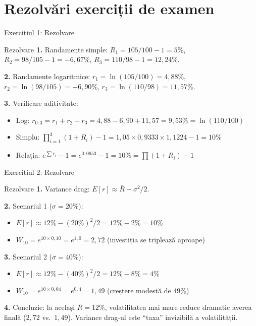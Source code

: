 \documentclass[9pt, aspectratio=169, t]{beamer}
\theoremstyle{definition}
\begin{document}
\section{Rezolvări exerciții de examen}

\begin{frame}{Exercițiul 1: Rezolvare}
\begin{block}{Rezolvare}
\textbf{1.} Randamente simple: $R_1 = 105/100 - 1 = 5\%$, $R_2 = 98/105 - 1 = -6{,}67\%$, $R_3 = 110/98 - 1 = 12{,}24\%$.

\textbf{2.} Randamente logaritmice: $r_1 = \ln(105/100) = 4{,}88\%$, $r_2 = \ln(98/105) = -6{,}90\%$, $r_3 = \ln(110/98) = 11{,}57\%$.

\textbf{3.} Verificare aditivitate:
\begin{itemize}
\item Log: $r_{0:3} = r_1 + r_2 + r_3 = 4{,}88 - 6{,}90 + 11{,}57 = 9{,}53\% = \ln(110/100)$ \checkmark
\item Simplu: $\prod_{i=1}^{3}(1 + R_i) - 1 = 1{,}05 \times 0{,}9333 \times 1{,}1224 - 1 = 10\%$ \checkmark
\item Relația: $e^{\sum r_i} - 1 = e^{0{,}0953} - 1 = 10\% = \prod(1+R_i) - 1$ \checkmark
\end{itemize}
\end{block}
\end{frame}

\begin{frame}{Exercițiul 2: Rezolvare}
\begin{block}{Rezolvare}
\textbf{1.} Variance drag: $E[r] \approx \bar{R} - \sigma^2/2$.

\textbf{2.} Scenariul 1 ($\sigma = 20\%$):
\begin{itemize}
\item $E[r] \approx 12\% - (20\%)^2/2 = 12\% - 2\% = 10\%$
\item $W_{10} = e^{10 \times 0{,}10} = e^{1{,}0} = 2{,}72$ (investiția se triplează aproape)
\end{itemize}

\textbf{3.} Scenariul 2 ($\sigma = 40\%$):
\begin{itemize}
\item $E[r] \approx 12\% - (40\%)^2/2 = 12\% - 8\% = 4\%$
\item $W_{10} = e^{10 \times 0{,}04} = e^{0{,}4} = 1{,}49$ (creștere modestă de 49\%)
\end{itemize}

\textbf{4.} Concluzie: la același $\bar{R} = 12\%$, volatilitatea mai mare reduce dramatic averea finală ($2{,}72$ vs.\ $1{,}49$). Variance drag-ul este ``taxa'' invizibilă a volatilității.
\end{block}
\end{frame}
\end{document}
